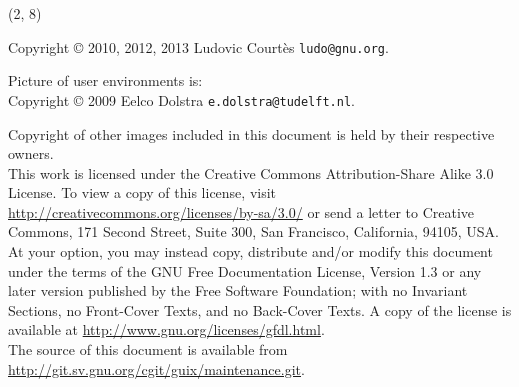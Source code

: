 \documentclass{beamer}
\begin{document}
\begin{frame}{}

  \begin{textblock}{12}(2, 8)
    \tiny{
      Copyright \copyright{} 2010, 2012, 2013 Ludovic Courtès \texttt{ludo@gnu.org}.

      Picture of user environments is: \\
      Copyright \copyright{} 2009 Eelco Dolstra \texttt{e.dolstra@tudelft.nl}.

      Copyright of other images included in this document is held by
      their respective owners.
      \\[3.0mm]
      This work is licensed under the \alert{Creative Commons
        Attribution-Share Alike 3.0} License.  To view a copy of this
      license, visit
      \url{http://creativecommons.org/licenses/by-sa/3.0/} or send a
      letter to Creative Commons, 171 Second Street, Suite 300, San
      Francisco, California, 94105, USA.
      \\[2.0mm]
      At your option, you may instead copy, distribute and/or modify
      this document under the terms of the \alert{GNU Free Documentation
        License, Version 1.3 or any later version} published by the Free
      Software Foundation; with no Invariant Sections, no Front-Cover
      Texts, and no Back-Cover Texts.  A copy of the license is
      available at \url{http://www.gnu.org/licenses/gfdl.html}.
      \\[2.0mm]
      The source of this document is available from
      \url{http://git.sv.gnu.org/cgit/guix/maintenance.git}.
    }
  \end{textblock}
\end{frame}
\end{document}
